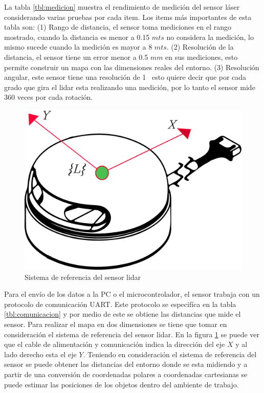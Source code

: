 La tabla \ref{tbl:medicion} muestra el rendimiento de medici\'on del 
sensor l\'aser \cite{Slamtec} considerando varias pruebas por cada item. Los items más 
importantes de esta tabla son: (1) Rango de distancia, el sensor toma mediciones en el
rango mostrado, cuando la distancia es menor a 0.15 $mts$ no considera la medición, lo 
mismo sucede cuando la medición es mayor a 8 $mts$. (2) Resolución de la distancia, el 
sensor tiene un error menor a 0.5 $mm$ en sus mediciones, esto permite construir un mapa 
con las dimensiones reales del entorno. (3) Resolución angular, este sensor tiene una 
resolución de 1\grad~ esto quiere decir que por cada grado que gira el lidar esta 
realizando una medición, por lo tanto el sensor mide 360 veces por cada rotación.

\begin{figure}
	\centering \footnotesize
	\includegraphics[width=0.40\linewidth]{images/frame_laser.png}
	\captionsetup{font=footnotesize}
	\caption{Sistema de referencia del sensor lidar}
	\label{fig:FrameLidar}
\end{figure}

Para el envío de los datos a la PC o el microcontrolador, el sensor trabaja con un protocolo
de comunicación UART. Este protocolo se especifíca en la tabla \ref{tbl:comunicacion} y 
por medio de este se obtiene las distancias que mide el sensor. Para realizar el mapa en 
dos dimensiones se tiene que tomar en consideración el sistema de referencia del sensor 
lidar. En la figura \ref{fig:FrameLidar} se puede ver que el cable de alimentación y comunicación 
indica la dirección del eje $X$ y al lado derecho esta el eje $Y$. Teniendo en consideración el sistema 
de referencia del sensor se puede obtener las distancias del entorno donde se esta midiendo y a partir
de una conversión de coordenadas polares a coordenadas cartesianas se puede estimar las posiciones 
de los objetos dentro del ambiente de trabajo.

